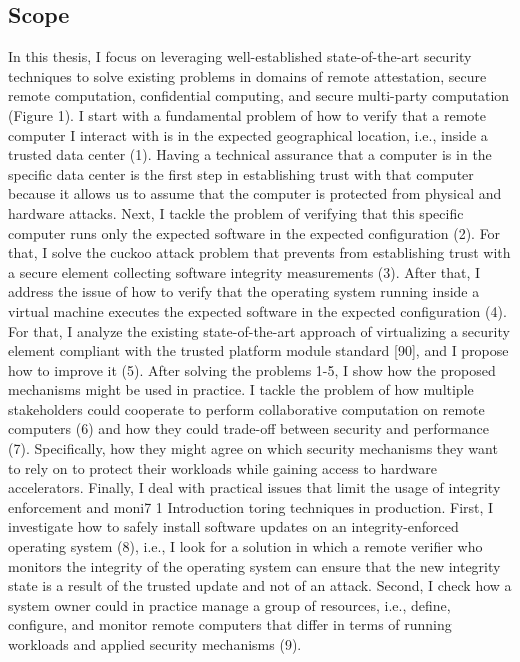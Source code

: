 \documentclass[acmtog]{acmart}
\begin{document}
\subsection{Scope}
\raggedright In this thesis, I focus on leveraging well-established state-of-the-art security techniques to solve existing problems in domains of remote attestation, secure remote computation, confidential computing, and secure multi-party computation (Figure 1). I start with a fundamental problem of how to verify that a remote computer I interact with is in the expected geographical location, i.e., inside a trusted data center (1). Having a technical assurance that a computer is in the specific data center is the first step in establishing trust with that computer because it allows us to assume that the computer is protected from physical and hardware attacks. Next, I tackle the problem of verifying that this specific computer runs only the expected software in the expected configuration (2). For that, I solve the cuckoo attack problem that prevents from establishing trust with a secure element collecting software integrity measurements (3). After that, I address the issue of how to verify that the operating system running inside a virtual machine executes the expected software in the expected configuration (4). For that, I analyze the existing state-of-the-art approach of virtualizing a security element compliant with the trusted platform module standard [90], and I propose how to improve it (5). After solving the problems 1-5, I show how the proposed mechanisms might be used in practice. I tackle the problem of how multiple stakeholders could cooperate to perform collaborative computation on remote computers (6) and how they could trade-off between security and performance (7). Specifically, how they might agree on which security mechanisms they want to rely on to protect their workloads while gaining access to hardware accelerators. Finally, I deal with practical issues that limit the usage of integrity enforcement and moni7 1 Introduction toring techniques in production. First, I investigate how to safely install software updates on an integrity-enforced operating system (8), i.e., I look for a solution in which a remote verifier who monitors the integrity of the operating system can ensure that the new integrity state is a result of the trusted update and not of an attack. Second, I check how a system owner could in practice manage a group of resources, i.e., define, configure, and monitor remote computers that differ in terms of running workloads and applied security mechanisms (9).
\end{document}
